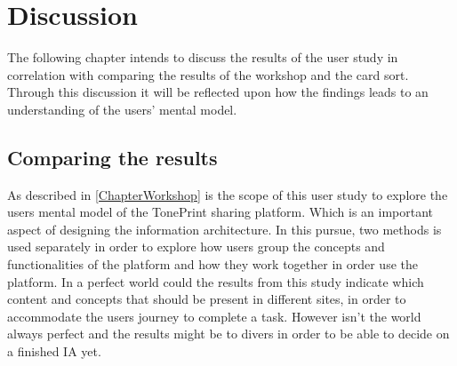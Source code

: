 \chapter{Discussion}
\label{Discussion}
The following chapter intends to discuss the results of the user study in correlation with comparing the results of the workshop and the card sort. Through this discussion it will be reflected upon how the findings leads to an understanding of the users' mental model.

\section{Comparing the results}
\label{ComparingResults}
As described in \autoref{ChapterWorkshop} is the scope of this user study to explore the users mental model of the TonePrint sharing platform. Which is an important aspect of designing the information architecture. In this pursue, two methods is used separately in order to explore how users group the concepts and functionalities of the platform and how they work together in order use the platform. In a perfect world could the results from this study indicate which content and concepts that should be present in different sites, in order to accommodate the users journey to complete a task. However isn't the world always perfect and the results might be to divers in order to be able to decide on a finished IA yet.


